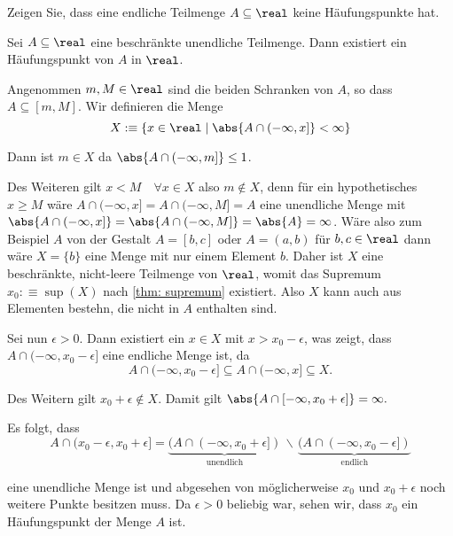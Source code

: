 \begin{ex} Zeigen Sie, dass eine endliche Teilmenge $A \subseteq\real$ keine Häufungspunkte hat.
\end{ex}

\begin{thm}
  Sei $A \subseteq \real$ eine beschränkte unendliche Teilmenge. Dann existiert ein Häufungspunkt von $A$ in $\real$.
\end{thm}
\begin{prf}
  Angenommen $m, M \in \real$ sind die beiden Schranken von $A$, so dass $A \subseteq [m,M]$. Wir definieren die Menge
  \[
    X :\equiv \{ x \in \real \mid \abs{A \cap (-\infty, x] } < \infty \}
  \]

  Dann ist $m \in X$ da $\abs{A \cap (-\infty,m]} \leq 1$.

  Des Weiteren gilt $x < M \quad \forall x \in X$ also $m \notin X$, denn für ein hypothetisches $x \geq M$ wäre $A \cap (-\infty,x] = A \cap (-\infty, M] = A$ eine unendliche Menge mit $\abs{A \cap (-\infty,x]} = \abs{A \cap (-\infty, M]} = \abs{A}=\infty$. Wäre also zum Beispiel $A$ von der Gestalt $A=[b,c]$ oder $A = (a,b)$ für $b,c \in \real$ dann wäre $X=\{b \}$ eine Menge mit nur einem Element $b$.
  Daher ist $X$ eine beschränkte, nicht-leere Teilmenge von $\real$, womit das Supremum $x_0 :\equiv \sup(X)$ nach \ref{thm: supremum} existiert. Also $X$ kann auch aus Elementen bestehn, die nicht in $A$ enthalten sind.

  Sei nun $\epsilon>0$. Dann existiert ein $x\in X$ mit $x > x_0 - \epsilon$, was zeigt, dass $A\cap (-\infty, x_0 -\epsilon]$ eine endliche Menge ist, da
  \[
    A\cap (-\infty, x_0 -\epsilon] \subseteq A \cap (-\infty, x] \subseteq X.
  \]

  Des Weitern gilt $x_0 + \epsilon \notin X$. Damit gilt
  $
    \abs{A \cap [-\infty, x_0 + \epsilon]} = \infty.
  $

  Es folgt, dass
  \[
    A \cap (x_0 - \epsilon, x_0 + \epsilon] =
    \underbrace{(A \cap (-\infty, x_0 + \epsilon])}_{\text{unendlich}} \, \backslash \,  \underbrace{(A \cap (-\infty, x_0 - \epsilon])}_{\text{endlich}}
  \]

  eine unendliche Menge ist und abgesehen von möglicherweise $x_0$ und
  $x_0 + \epsilon$ noch weitere Punkte besitzen muss. Da $\epsilon > 0$ beliebig war, sehen wir, dass $x_0$ ein Häufungspunkt der Menge $A$ ist.
\end{prf}

